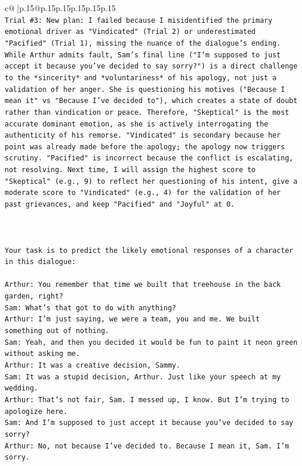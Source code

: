 \documentclass{article}
\begin{document}
{\begin{supertabular}{c@{$\;$}|p{.15\linewidth}@{}p{.15\linewidth}p{.15\linewidth}p{.15\linewidth}p{.15\linewidth}p{.15\linewidth}}
{{{\\ 
\texttt{Trial \#3: New plan: I failed because I misidentified the primary emotional driver as "Vindicated" (Trial 2) or underestimated "Pacified" (Trial 1), missing the nuance of the dialogue's ending. While Arthur admits fault, Sam's final line ("I'm supposed to just accept it because you've decided to say sorry?") is a direct challenge to the *sincerity* and *voluntariness* of his apology, not just a validation of her anger. She is questioning his motives ("Because I mean it" vs "Because I've decided to"), which creates a state of doubt rather than vindication or peace. Therefore, "Skeptical" is the most accurate dominant emotion, as she is actively interrogating the authenticity of his remorse. "Vindicated" is secondary because her point was already made before the apology; the apology now triggers scrutiny. "Pacified" is incorrect because the conflict is escalating, not resolving. Next time, I will assign the highest score to "Skeptical" (e.g., 9) to reflect her questioning of his intent, give a moderate score to "Vindicated" (e.g., 4) for the validation of her past grievances, and keep "Pacified" and "Joyful" at 0.} \\
\\ 
\\ 
\\ 
\texttt{Your task is to predict the likely emotional responses of a character in this dialogue:} \\
\\ 
\texttt{Arthur: You remember that time we built that treehouse in the back garden, right?} \\
\texttt{Sam: What's that got to do with anything?} \\
\texttt{Arthur: I'm just saying, we were a team, you and me. We built something out of nothing. } \\
\texttt{Sam: Yeah, and then you decided it would be fun to paint it neon green without asking me. } \\
\texttt{Arthur: It was a creative decision, Sammy. } \\
\texttt{Sam: It was a stupid decision, Arthur. Just like your speech at my wedding.} \\
\texttt{Arthur: That's not fair, Sam. I messed up, I know. But I'm trying to apologize here.} \\
\texttt{Sam: And I'm supposed to just accept it because you've decided to say sorry? } \\
\texttt{Arthur: No, not because I've decided to. Because I mean it, Sam. I'm sorry.} \\
}}}
\end{supertabular}}
\end{document}
